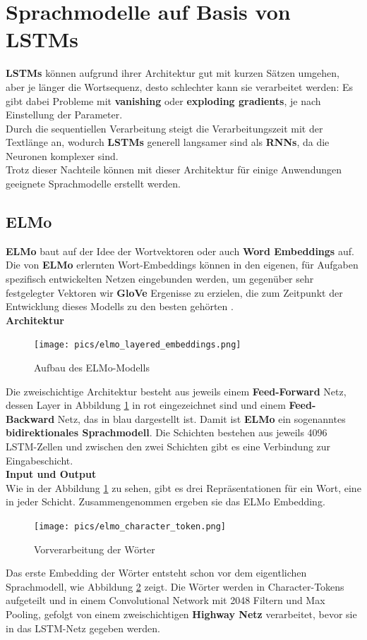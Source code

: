 \section{Sprachmodelle auf Basis von LSTMs}
\textbf{LSTMs} k\"onnen aufgrund ihrer Architektur gut mit kurzen S\"atzen umgehen, aber je l\"anger die Wortsequenz, desto schlechter kann sie verarbeitet werden: Es gibt dabei Probleme mit \textbf{vanishing} oder \textbf{exploding gradients}, je nach Einstellung der Parameter.\\
Durch die sequentiellen Verarbeitung steigt die Verarbeitungszeit mit der Textl\"ange an, wodurch \textbf{LSTMs} generell langsamer sind als \textbf{RNNs}, da die Neuronen komplexer sind.\\
Trotz dieser Nachteile k\"onnen mit dieser Architektur f\"ur einige Anwendungen geeignete Sprachmodelle erstellt werden.


\subsection{ELMo}
\textbf{ELMo} baut auf der Idee der Wortvektoren oder auch \textbf{Word Embeddings} auf. Die von \textbf{ELMo} erlernten Wort-Embeddings k\"onnen in den eigenen, f\"ur Aufgaben spezifisch entwickelten Netzen eingebunden werden, um gegen\"uber sehr festgelegter Vektoren wir \textbf{GloVe} Ergenisse zu erzielen, die zum Zeitpunkt der Entwicklung dieses Modells zu den besten geh\"orten \cite{elmo}.\\

\textbf{Architektur}\\
\begin{figure}[!ht]
\centering
\texttt{[image: pics/elmo\_layered\_embeddings.png]}
\caption{Aufbau des ELMo-Modells \cite{elmoex}}
\label{fig:elmo_layers}
\end{figure}
Die zweischichtige Architektur besteht aus jeweils einem \textbf{Feed-Forward} Netz, dessen Layer in Abbildung \ref{fig:elmo_layers} in rot eingezeichnet sind und einem \textbf{Feed-Backward} Netz, das in blau dargestellt ist. Damit ist \textbf{ELMo} ein sogenanntes \textbf{bidirektionales Sprachmodell}. Die Schichten bestehen aus jeweils 4096 LSTM-Zellen und zwischen den zwei Schichten gibt es eine Verbindung zur Eingabeschicht.\\

\textbf{Input und Output}\\
Wie in der Abbildung \ref{fig:elmo_layers} zu sehen, gibt es drei Repr\"asentationen f\"ur ein Wort, eine in jeder Schicht. Zusammengenommen ergeben sie das ELMo Embedding.
\begin{figure}[!ht]
\centering
\texttt{[image: pics/elmo\_character\_token.png]}
\caption{Vorverarbeitung der W\"orter \cite{elmoex}}
\label{fig:elmo_character}
\end{figure}
Das erste Embedding der W\"orter entsteht schon vor dem eigentlichen Sprachmodell, wie Abbildung \ref{fig:elmo_character} zeigt. Die W\"orter werden in Character-Tokens aufgeteilt und in einem Convolutional Network mit 2048 Filtern und Max Pooling, gefolgt von einem zweischichtigen \textbf{Highway Netz} verarbeitet, bevor sie in das LSTM-Netz gegeben werden.\\

